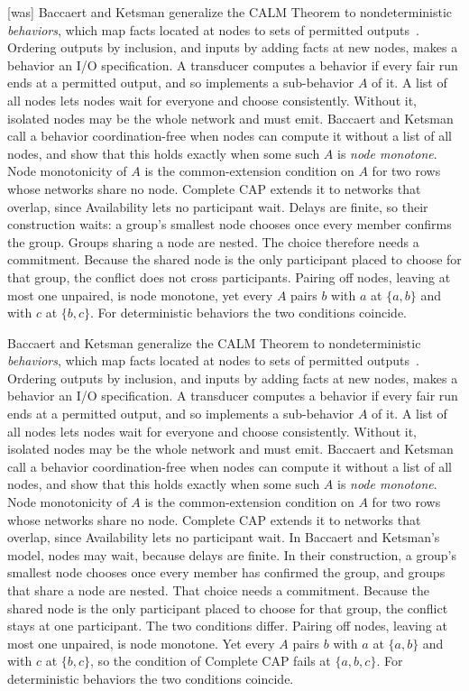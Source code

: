 \documentclass[sigconf]{cidr-2027}
\theoremstyle{remark}
\newcommand{\commitment}{commitment\xspace}
\newcommand{\spectype}[1][]{I/O specification#1\xspace}
\begin{document}
{\footnotesize\color{black!50}\noindent\textsf{[was]} Baccaert and Ketsman generalize the CALM Theorem to nondeterministic
\emph{behaviors}, which map facts located at nodes to sets of permitted
outputs~\cite{baccaert2023dcbq,baccaert2026spectrum}.  Ordering outputs by
inclusion, and inputs by adding facts at new nodes, makes a behavior an
\spectype.  A transducer computes a behavior if every fair run ends at a
permitted output, and so implements a sub-behavior $A$ of it.  A list of all
nodes lets nodes wait for everyone and choose consistently.  Without it,
isolated nodes may be the whole network and must emit.  Baccaert and Ketsman
call a behavior coordination-free when nodes can compute it without a list of
all nodes, and show that this holds exactly when some such $A$ is \emph{node
monotone}.  Node monotonicity of $A$ is the common-extension condition on $A$
for two rows whose networks share no node.  Complete CAP extends it to networks
that overlap, since Availability lets no participant wait.  Delays are finite, so their construction waits: a group's smallest node
chooses once every member confirms the group.  Groups sharing a node are
nested.  The choice therefore needs a \commitment.  Because the shared node is
the only participant placed to choose for that group, the conflict does not
cross participants.  Pairing off nodes, leaving at
most one unpaired, is node monotone, yet every $A$ pairs $b$ with $a$ at $\{a,b\}$ and
with $c$ at $\{b,c\}$.  For deterministic behaviors the two conditions
coincide.\par}

\color{blue!70!black}Baccaert and Ketsman generalize the CALM Theorem to nondeterministic
\emph{behaviors}, which map facts located at nodes to sets of permitted
outputs~\cite{baccaert2023dcbq,baccaert2026spectrum}.  Ordering outputs by
inclusion, and inputs by adding facts at new nodes, makes a behavior an
\spectype.  A transducer computes a behavior if every fair run ends at a
permitted output, and so implements a sub-behavior $A$ of it.  A list of all
nodes lets nodes wait for everyone and choose consistently.  Without it,
isolated nodes may be the whole network and must emit.  Baccaert and Ketsman
call a behavior coordination-free when nodes can compute it without a list of
all nodes, and show that this holds exactly when some such $A$ is \emph{node
monotone}.  Node monotonicity of $A$ is the common-extension condition on $A$
for two rows whose networks share no node.  Complete CAP extends it to networks that overlap, since Availability lets
no participant wait.  In Baccaert and Ketsman's model, nodes may wait, because delays are finite.  In
their construction, a group's smallest node chooses once every member has
confirmed the group, and groups that share a node are nested.  That choice
needs a \commitment.  Because the shared node is the only participant placed
to choose for that group, the conflict stays at one participant.  The two
conditions differ.  Pairing off nodes, leaving at most one unpaired, is node
monotone.  Yet every $A$ pairs $b$ with $a$ at $\{a,b\}$ and with $c$ at
$\{b,c\}$, so the condition of Complete CAP fails at $\{a,b,c\}$.  For
deterministic behaviors the two conditions coincide.\color{black}
\end{document}
